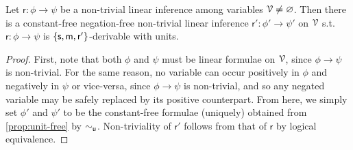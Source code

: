 \documentclass[a4paper, UKenglish, cleveref]{lipics-v2019}
\begin{document}
\begin{proposition}
  \label{prop:const-free-neg-free}
  Let \(\mathsf r: \phi \to \psi\) be a non-trivial linear inference among variables $\mathcal{V} \neq \varnothing$.
  Then there is a constant-free negation-free non-trivial linear inference \(\mathsf r' : \phi' \to \psi'\) on $\mathcal{V}$
  s.t.\ $\mathsf r: \phi \to \psi$ is $\{\mathsf{s},\mathsf{m},\mathsf r' \}$-derivable with units.
\end{proposition}
\begin{proof}
  First, note that both $\phi$ and $\psi$ must be linear formulae on $\mathcal{V}$, since $\phi \to \psi$ is non-trivial.
  For the same reason, no variable can occur positively in $\phi$ and negatively in $\psi$ or vice-versa, since $\phi \to \psi$ is non-trivial, and so any negated variable may be safely replaced by its positive counterpart.
From here, we simply set $\phi'$ and $\psi' $ to be the constant-free formulae (uniquely) obtained from \cref{prop:unit-free} by $\sim_{\mathsf{u}}$.
Non-triviality of $\mathsf r'$ follows from that of $\mathsf r$ by logical equivalence.
%
\end{proof}
\end{document}
